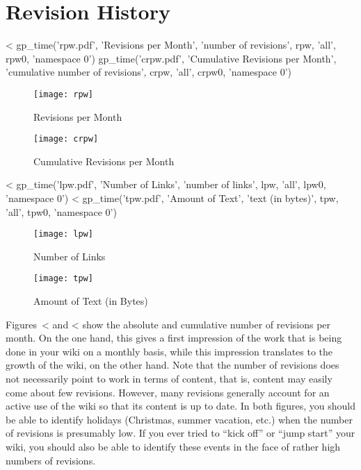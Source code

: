 \documentclass{scrartcl}
\begin{document}

\section{Revision History} %
\label{sec:revision_history}

<%
gp_time('rpw.pdf', 'Revisions per Month', 'number of revisions', 
        rpw, 'all', rpw0, 'namespace 0')
gp_time('crpw.pdf', 'Cumulative Revisions per Month', 
        'cumulative number of revisions',
        crpw, 'all', crpw0, 'namespace 0')
\begin{figure}
	\centering
	\texttt{[image: rpw]}
	\caption{Revisions per Month}
	\label{fig:revisions_per_month}
        \vfill

	\texttt{[image: crpw]}
	\caption{Cumulative Revisions per Month}
	\label{fig:cumulative_revisions_per_month}
\end{figure}

<%
gp_time('lpw.pdf', 'Number of Links', 'number of links', 
        lpw, 'all', lpw0, 'namespace 0')
<%
gp_time('tpw.pdf', 'Amount of Text', 'text (in bytes)', 
        tpw, 'all', tpw0, 'namespace 0')
\begin{figure}
	\centering
	\texttt{[image: lpw]}
	\caption{Number of Links}
	\label{fig:number_of_links}

	\texttt{[image: tpw]}
	\caption{Amount of Text (in Bytes)}
	\label{fig:amount_of_text}
\end{figure}

Figures~<%
and 
<%
show the absolute and cumulative number of revisions per month. On the one hand, this gives a first impression of the work that is being done in your wiki on a monthly basis, while this impression translates to the growth of the wiki, on the other hand. Note that the number of revisions does not necessarily point to work in terms of content, that is, content may easily come about few revisions. However, many revisions generally account for an active use of the wiki so that its content is up to date. In both figures, you should be able to identify holidays (Christmas, summer vacation, etc.) when the number of revisions is presumably low. If you ever tried to ``kick off'' or ``jump start'' your wiki, you should also be able to identify these events in the face of rather high numbers of revisions.
\end{document}
